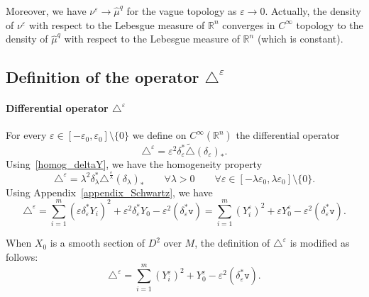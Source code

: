 \documentclass[AHL,Unicode,published]{cedram}
\newcommand*\R{\mathbb{R}}
\newcommand{\ttv}{\mathtt{v}}
\let\oldforall\forall
\renewcommand*{\forall}{\mathrel{\oldforall}}
\begin{document}
Moreover, we have $\nu^\varepsilon\rightarrow \widehat{\mu}^{q}$ for the vague topology as $\varepsilon\rightarrow 0$. Actually, the density of $\nu^\varepsilon$ with respect to the Lebesgue measure of $\R^n$ converges in $C^\infty$ topology to the density of $\widehat{\mu}^{q}$ with respect to the Lebesgue measure of $\R^n$ (which is constant).


\subsection{Definition of the operator \texorpdfstring{$\triangle^\varepsilon$}{triangle varepsilon}}

\goodbreak
\paragraph{Differential operator $\triangle^\varepsilon$} For every $\varepsilon\in[-\varepsilon_0,\varepsilon_0]\setminus\{0\}$ we define on $C^\infty(\R^n)$ the differential operator
\begin{equation}\label{def_triangleepsilon}
\triangle^\varepsilon = \varepsilon^2 \delta_\varepsilon^* \widetilde\triangle (\delta_\varepsilon)_*.
\end{equation}
Using~\eqref{homog_deltaY}, we have the homogeneity property
\begin{equation}\label{homog_deltaeps}
\triangle^\varepsilon = \lambda^2 \delta_\lambda^* \triangle^{\frac{\varepsilon}{\lambda}} (\delta_\lambda)_* \qquad \forall\lambda>0\qquad\forall\varepsilon\in[-\lambda\varepsilon_0,\lambda\varepsilon_0]\setminus\{0\}.
\end{equation}
Using Appendix~\ref{appendix_Schwartz}, we have
\begin{equation}\label{formula_Deltaeps}
\triangle^\varepsilon =
\sum_{i=1}^m \left(\varepsilon\delta_\varepsilon^*Y_i \right)^2 + \varepsilon^2\delta_\varepsilon^* Y_0 - \varepsilon^2 \left(\delta_\varepsilon^*\ttv \right) = \sum_{i=1}^m \left(Y^\varepsilon_i \right)^2 + \varepsilon Y^\varepsilon_0 - \varepsilon^2 \left(\delta_\varepsilon^*\ttv\right).
\end{equation}

When $X_0$ is a smooth section of $D^2$ over $M$, the definition of $\triangle^\varepsilon$ is modified as follows:
\[
\triangle^\varepsilon = \sum_{i=1}^m \left(Y^\varepsilon_i \right)^2 + Y^\varepsilon_0 - \varepsilon^2 \left(\delta_\varepsilon^*\ttv\right).
\]

\goodbreak
\end{document}
